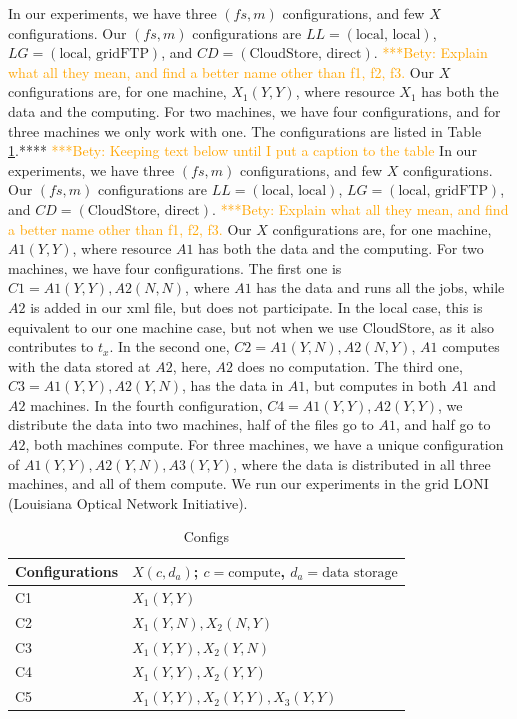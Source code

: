 \documentclass{rspublic}
\newcommand{\betynote}[1]{ {\textcolor{orange} { ***Bety: #1 }}}
\begin{document}
In our experiments, we have three $(fs, m)$ configurations, and few $X$
configurations. Our $(fs, m)$ configurations are $LL=(\mbox{local,
local})$, $LG=(\mbox{local, gridFTP})$, and $CD=(\mbox{CloudStore,
direct})$.\betynote{Explain what all they mean, and find a better name
other than f1, f2, f3.} Our $X$ configurations are, for one machine,
$X_1(Y,Y)$, where resource $X_1$ has both the data and the computing.
For two machines, we have four configurations, and for three machines we
only work with one. The configurations are listed in Table
\ref{Tab:Configs}.****
\betynote{Keeping text below until I put a caption to the table}
In our experiments, we have three $(fs, m)$ configurations, and few $X$
configurations. Our $(fs, m)$ configurations are $LL=(\mbox{local,
local})$, $LG=(\mbox{local, gridFTP})$, and $CD=(\mbox{CloudStore,
direct})$.\betynote{Explain what all they mean, and find a better name
other than f1, f2, f3.} Our $X$ configurations are, for one machine,
$A1(Y,Y)$, where resource $A1$ has both the data and the computing. For
two machines, we have four configurations. The first one is $C1=A1(Y,
Y), A2(N, N)$, where $A1$ has the data and runs all the jobs, while $A2$
is added in our xml file, but does not participate. In the local case,
this is equivalent to our one machine case, but not when we use
CloudStore, as it also contributes to $t_x$. In the second one,
$C2=A1(Y, N), A2(N, Y)$, $A1$ computes with the data stored at $A2$,
here, $A2$ does no computation. The third one, $C3=A1(Y, Y), A2(Y, N)$,
has the data in $A1$, but computes in both $A1$ and $A2$ machines. In
the fourth configuration, $C4=A1(Y, Y), A2(Y, Y)$, we distribute the
data into two machines, half of the files go to $A1$, and half go to
$A2$, both machines compute. For three machines, we have a unique
configuration of $A1(Y, Y), A2(Y, N), A3(Y, Y)$, where the data is
distributed in all three machines, and all of them compute. We run our
experiments in the grid LONI (Louisiana Optical Network Initiative).

\begin{table}
\begin{center}
    \begin{tabular}{ | l | l |}
    \hline
    Configurations & $X(c,d_a)$; $c= \mbox{compute}$, $d_a=\mbox{data storage}$  \\ \hline
    C1 & $X_1(Y,Y)$  \\ \hline
    C2 & $X_1(Y,N), X_2(N,Y)$ \\ \hline
    C3 & $X_1(Y,Y), X_2(Y,N)$ \\ \hline
    C4 & $X_1(Y,Y), X_2(Y,Y)$ \\ \hline
    C5 & $X_1(Y,Y), X_2(Y,Y), X_3(Y,Y)$ \\ 
    \hline
    \end{tabular}
\end{center}
    \caption{Configs}
    \label{Tab:Configs}
\end{table}
\end{document}
